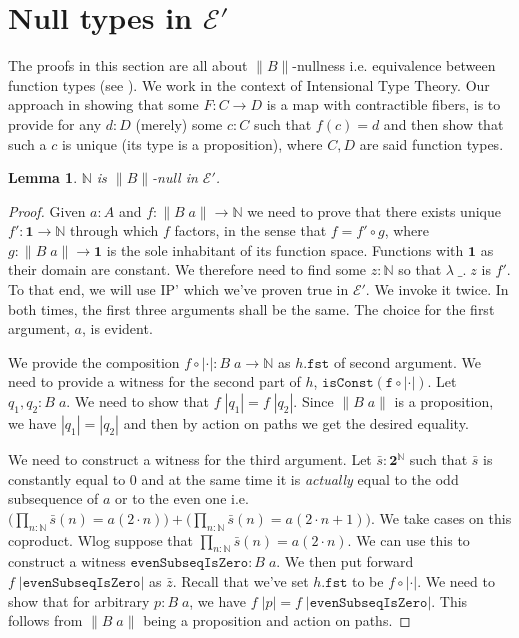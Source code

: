 \documentclass[12pt]{report}
\newtheorem{lem}[thm]{Lemma}
\theoremstyle{definition}
\begin{document}
\section{Null types in $\mathcal{E}'$}\label{SectionNullTypesInE}
The proofs in this section are all about $\lVert B \rVert$-nullness i.e. equivalence between function types (see ). 
We work in the context of Intensional Type Theory. 
Our approach in showing that some $F: C\rightarrow D$ is a map with contractible fibers, is to provide for any $d :D$ (merely) some $c :C$ such that $f(c) = d$ and then show that such a $c$ is unique (its type is a proposition), where $C,D$ are said function types. 
\begin{lem}\label{NisBnull}
$\mathbb{N}$ is $\lVert B \rVert$-null in $\mathcal{E}'$.
\end{lem}
\begin{proof}
Given $a : A$ and $f : \lVert B\; a \rVert \rightarrow \mathbb{N}$ we need to prove that there exists unique $f' : \mathbf{1} \rightarrow \mathbb{N}$ through which $f$ factors, in the sense that $f = f' \circ g$, where $g : \lVert B\; a \rVert \rightarrow \mathbf{1}$ is the sole inhabitant of its function space. 
Functions with $\mathbf{1}$ as their domain are constant. 
We therefore need to find some $z : \mathbb{N}$ so that $\lambda\; \_.\; z$ is $f'$. 
To that end, we will use IP' which we've proven true in $\mathcal{E}'$. 
We invoke it twice. 
In both times, the first three arguments shall be the same. 
The choice for the first argument, $a$, is evident. 

We provide the composition $f \circ |\cdot| : B\; a \rightarrow \mathbb{N}$ as $h.\mathtt{fst}$ of second argument. 
We need to provide a witness for the second part of $h$, $\mathtt{isConst(f \circ |\cdot|)}$. 
Let $q_1,q_2 : B\;a$. 
We need to show that $f\;|q_1| = f\; |q_2|$. 
Since $\lVert B\; a\rVert$ is a proposition, we have $|q_1| = |q_2|$ and then by action on paths we get the desired equality.

We need to construct a witness for the third argument. 
Let $\bar{s} : \mathbf{2}^\mathbb{N}$ such that $\bar{s}$ is constantly equal to $0$ and at the same time it is \textit{actually} equal to the odd subsequence of $a$ or to the even one i.e. $\big(\prod_{n : \mathbb{N}} \bar{s}(n) = a(2 \cdot n)\big) + \big(\prod_{n : \mathbb{N}} \bar{s}(n) = a(2\cdot n +1)\big)$. 
We take cases on this coproduct. 
Wlog suppose that $\prod_{n : \mathbb{N}} \bar{s}(n) = a(2 \cdot n)$. 
We can use this to construct a witness $\mathtt{evenSubseqIsZero} : B\;a$. 
We then put forward $f\;|\mathtt{evenSubseqIsZero}|$ as $\bar{z}$. 
Recall that we've set $h.\mathtt{fst}$ to be $f\circ |\cdot|$.
We need to show that for arbitrary $p : B\;a $, we have $f\; |p| = f\;|\mathtt{evenSubseqIsZero}|$. 
This follows from $\lVert B\;a\rVert$ being a proposition and action on paths. 


\end{proof}
\end{document}
